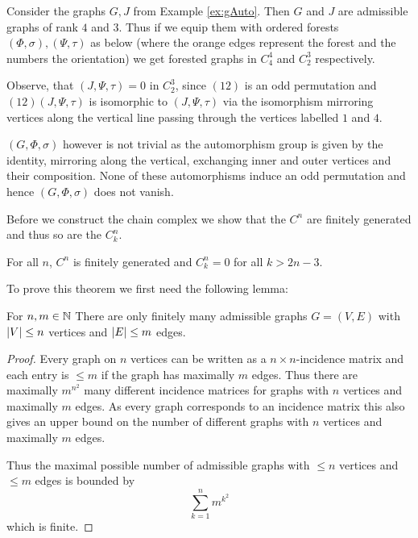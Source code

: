 \begin{eg}\label{ex:fg}
	Consider the graphs $G, J$ from Example \ref{ex:gAuto}. Then $G$ and $J$ are admissible graphs of rank $4$ and $3$. Thus if we equip them with ordered forests 
	$(\Phi,\sigma), (\Psi,\tau)$ as below 
	(where the orange edges represent the forest and the numbers the orientation) we get forested graphs in $C^{4}_{4}$ and $C^{3}_{2}$ respectively.


	Observe, that $(J,\Psi,\tau) = 0$ in $C_{2}^{3}$, since $ (1 2)$ is an odd permutation and  $(1 2) (J,\Psi,\tau)$ is isomorphic to $(J,\Psi,\tau)$ 
	via the isomorphism mirroring vertices along the vertical line passing through the vertices labelled $1$ and $4$.

	$(G,\Phi,\sigma)$ however is not trivial as the automorphism group is given by the identity,
	mirroring along the vertical, exchanging inner and outer vertices and their composition.
	None of these automorphisms induce an odd permutation and hence $(G,\Phi,\sigma)$ does not vanish.
\end{eg}

Before we construct the chain complex we show that the $C^{n}$ are finitely generated and thus so are the $C_{k}^{n}$.

\begin{theorem}\label{thm:finGenCn}
	For all $n$, $C^{n}$ is finitely generated and $C_{k}^{n} = 0$ for all $k > 2n-3$. 
\end{theorem}

To prove this theorem we first need the following lemma:
\begin{lemma}
	For $n,m \in \mathbb{N}$ There are only finitely many admissible graphs $G = (V,E)$ with $\abs{V} \leq n$ vertices and $ \abs{E} \leq m$ edges.
\end{lemma}

\begin{proof}
	Every graph on $n$ vertices can be written as a $n\times n$-incidence matrix and each entry is $\leq m$ if the graph has maximally $m$ edges. 
	Thus there are maximally $m^{n^2}$ many different incidence matrices for graphs with  $n$ vertices and maximally $m$ edges.
	As every graph corresponds to an incidence matrix this also gives an upper bound on the number of different graphs with $n$ vertices
	and maximally $m$ edges.

	Thus the maximal possible number of admissible graphs with $\leq n$ vertices and $\leq m$ edges is bounded by
	\[
		\sum_{k=1}^{n} m^{k^2} 
	\]
	which is finite.
\end{proof}

